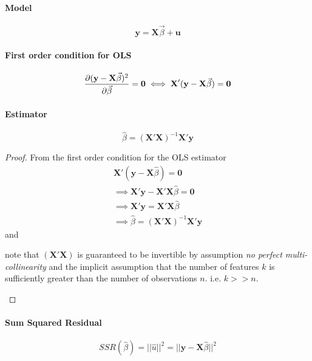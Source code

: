 \documentclass[]{article}
\begin{document}
    		\paragraph{Model}
    			\[
    				\textbf{y} = \textbf{X} \vec{\beta} + \textbf{u}
    			\]
    		\paragraph{First order condition for OLS}
    			\begin{gather*}
					\frac{\partial{(\textbf{y} - \textbf{X}\vec{\beta})^2}}{\partial{\vec{\beta}}} = \textbf{0}
					\iff \textbf{X}' (\textbf{y} - \textbf{X}\vec{\beta}) = \textbf{0}
    			\end{gather*}
    		\paragraph{Estimator}	
    			\[
    				\hat{\beta} = (\textbf{X}' \textbf{X})^{-1} \textbf{X}' \textbf{y}
    			\]
    			\begin{proof}
    				From the first order condition for the OLS estimator
    				\begin{gather*}
    					\textbf{X}' (\textbf{y} - \textbf{X} \hat{\beta}) = \textbf{0} \\
    					\implies \textbf{X}' \textbf{y} - \textbf{X}' \textbf{X} \hat{\beta} = \textbf{0} \\
    					\implies \textbf{X}' \textbf{y} = \textbf{X}' \textbf{X} \hat{\beta} \\
    					\implies \hat{\beta} = (\textbf{X}' \textbf{X})^{-1} \textbf{X}' \textbf{y}
    				\end{gather*}
    				and
    				\begin{remark}
	    				note that $(\textbf{X}' \textbf{X})$ is guaranteed to be invertible by assumption \emph{no perfect multi-collinearity} and the implicit assumption that the number of features $k$ is sufficiently greater than the number of observations $n$. i.e. $k >> n$.
    				\end{remark}
    			\end{proof}
    		\paragraph{Sum Squared Residual}
    		\[
    			SSR(\hat{\beta}) = ||\hat{u}||^2 = ||\textbf{y} - \textbf{X} \hat{\beta}||^2
    		\]
    		
\end{document}
